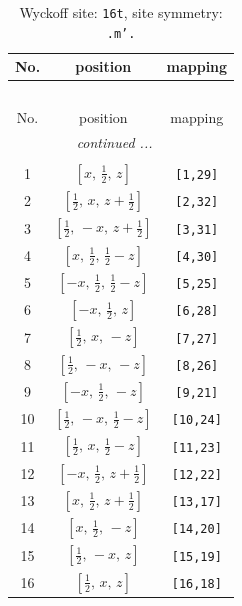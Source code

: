 \documentclass[fleqn,8pt]{jsarticle}
\begin{document}
\renewcommand{\arraystretch}{1.2}
\begin{longtable}{ccc}
\caption{Wyckoff site: {\tt 16t}, site symmetry: {\tt .m'.}}
 \\
 \hline \hline
No. & position & mapping \\ \hline \endfirsthead

\multicolumn{2}{l}{\tablename\ \thetable{}} \\
 \hline \hline
No. & position & mapping \\ \hline \endhead

 \hline \hline
\multicolumn{2}{r}{\footnotesize\it continued ...} \\ \endfoot

 \hline \hline
\multicolumn{2}{r}{} \\ \endlastfoot

1 & $\left[ x,\, \frac{1}{2},\, z \right]$ & {\tt [1,29]} \\ \hline
2 & $\left[ \frac{1}{2},\, x,\, z + \frac{1}{2} \right]$ & {\tt [2,32]} \\ \hline
3 & $\left[ \frac{1}{2},\, - x,\, z + \frac{1}{2} \right]$ & {\tt [3,31]} \\ \hline
4 & $\left[ x,\, \frac{1}{2},\, \frac{1}{2} - z \right]$ & {\tt [4,30]} \\ \hline
5 & $\left[ - x,\, \frac{1}{2},\, \frac{1}{2} - z \right]$ & {\tt [5,25]} \\ \hline
6 & $\left[ - x,\, \frac{1}{2},\, z \right]$ & {\tt [6,28]} \\ \hline
7 & $\left[ \frac{1}{2},\, x,\, - z \right]$ & {\tt [7,27]} \\ \hline
8 & $\left[ \frac{1}{2},\, - x,\, - z \right]$ & {\tt [8,26]} \\ \hline
9 & $\left[ - x,\, \frac{1}{2},\, - z \right]$ & {\tt [9,21]} \\ \hline
10 & $\left[ \frac{1}{2},\, - x,\, \frac{1}{2} - z \right]$ & {\tt [10,24]} \\ \hline
11 & $\left[ \frac{1}{2},\, x,\, \frac{1}{2} - z \right]$ & {\tt [11,23]} \\ \hline
12 & $\left[ - x,\, \frac{1}{2},\, z + \frac{1}{2} \right]$ & {\tt [12,22]} \\ \hline
13 & $\left[ x,\, \frac{1}{2},\, z + \frac{1}{2} \right]$ & {\tt [13,17]} \\ \hline
14 & $\left[ x,\, \frac{1}{2},\, - z \right]$ & {\tt [14,20]} \\ \hline
15 & $\left[ \frac{1}{2},\, - x,\, z \right]$ & {\tt [15,19]} \\ \hline
16 & $\left[ \frac{1}{2},\, x,\, z \right]$ & {\tt [16,18]} \\
\end{longtable}
\end{document}
